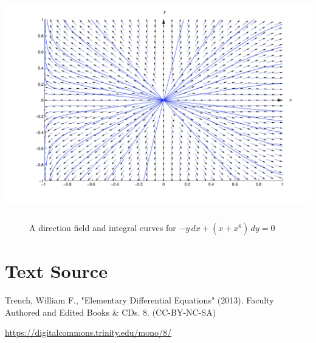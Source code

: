 \documentclass{ximera}
\begin{document}
\begin{example}
 \begin{image}
\includegraphics[height=3.66in]{fig020604.jpg}
\end{image}
\begin{center}
\begin{figure}
  \caption{A direction field and integral curves for $-y\,dx+(x+x^6)\,dy=0$}
  \label{figure:2.6.4}
\end{figure}
 \end{center}
\end{example}

\section*{Text Source}
Trench, William F., "Elementary Differential Equations" (2013). Faculty Authored and Edited Books \& CDs. 8. (CC-BY-NC-SA)

\href{https://digitalcommons.trinity.edu/mono/8/}{https://digitalcommons.trinity.edu/mono/8/}
\end{document}
